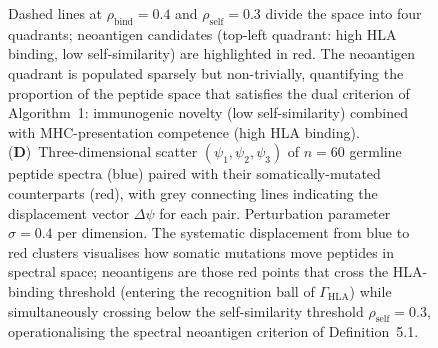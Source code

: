 \begin{figure}[!htbp]
{    Dashed lines at $\rho_\text{bind}=0.4$ and $\rho_\text{self}=0.3$ divide the space into four quadrants; neoantigen candidates (top-left quadrant: high HLA binding, low self-similarity) are highlighted in red.
    The neoantigen quadrant is populated sparsely but non-trivially, quantifying the proportion of the peptide space that satisfies the dual criterion of Algorithm~1: immunogenic novelty (low self-similarity) combined with MHC-presentation competence (high HLA binding).
    (\textbf{D})~Three-dimensional scatter $(\psi_1,\psi_2,\psi_3)$ of $n=60$ germline peptide spectra (blue) paired with their somatically-mutated counterparts (red), with grey connecting lines indicating the displacement vector $\Delta\psi$ for each pair.
    Perturbation parameter $\sigma=0.4$ per dimension.
    The systematic displacement from blue to red clusters visualises how somatic mutations move peptides in spectral space; neoantigens are those red points that cross the HLA-binding threshold (entering the recognition ball of $\Gamma_\text{HLA}$) while simultaneously crossing below the self-similarity threshold $\rho_\text{self}=0.3$, operationalising the spectral neoantigen criterion of Definition~5.1.}
    \label{fig:immuno_panel4}
\end{figure}

